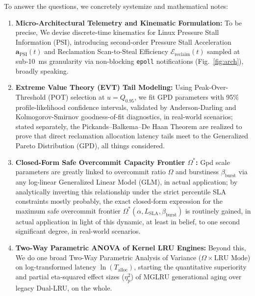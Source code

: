 \documentclass[pdflatex,sn-mathphys,Numbered]{sn-jnl}
\begin{document}
To answer the questions, we concretely systemize and mathematical notes:
\begin{enumerate}
    \item \textbf{Micro-Architectural Telemetry and Kinematic Formulation:} To be precise, We devise discrete-time kinematics for Linux Pressure Stall Information (PSI), introducing second-order Pressure Stall Acceleration $\mathbf{a}_{\text{PSI}}(t)$ and Reclamation Scan-to-Steal Efficiency $\mathcal{E}_{\text{reclaim}}(t)$ sampled at sub-10~ms granularity via non-blocking \texttt{epoll} notifications (Fig.~\ref{fig:arch}), broadly speaking.
    \item \textbf{Extreme Value Theory (EVT) Tail Modeling:} Using Peak-Over-Threshold (POT) selection at $u = Q_{0.95}$, we fit GPD parameters with 95\% profile-likelihood confidence intervals, validated by Anderson-Darling and Kolmogorov-Smirnov goodness-of-fit diagnostics, in real-world scenarios; stated separately, the Pickands--Balkema--De Haan Theorem are realized to prove that direct reclamation allocation latency tails meet to the Generalized Pareto Distribution (GPD), all things considered.
    \item \textbf{Closed-Form Safe Overcommit Capacity Frontier $\Omega^*$:} Gpd scale parameters are greatly linked to overcommit ratio $\Omega$ and burstiness $\beta_{\text{burst}}$ via any log-linear Generalized Linear Model (GLM), in actual application; by analytically inverting this relationship under the strict percentile SLA constraints mostly probably, the exact closed-form expression for the maximum safe overcommit frontier $\Omega^*(\alpha, L_{\text{SLA}}, \beta_{\text{burst}})$ is routinely gained, in actual application in light of this dynamic, at least in belief, to one second significant degree, in real-world scenarios.
    \item \textbf{Two-Way Parametric ANOVA of Kernel LRU Engines:} Beyond this, We do one broad Two-Way Parametric Analysis of Variance ($\Omega \times \text{LRU Mode}$) on log-transformed latency $\ln(T_{\text{alloc}})$, starting the quantitative superiority and partial eta-squared effect sizes ($\eta_p^2$) of MGLRU generational aging over legacy Dual-LRU, on the whole.

\end{enumerate}
\end{document}
